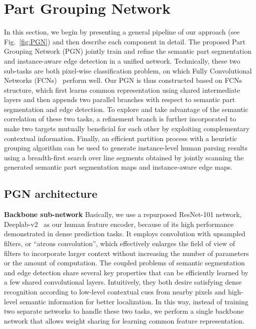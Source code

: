 \documentclass[runningheads]{llncs}
\begin{document}
\section{Part Grouping Network}
In this section, we begin by presenting a general pipeline of our approach (see Fig.~\ref{fig:PGN}) and then describe each component in detail. The proposed Part Grouping Network (PGN) jointly train and refine the semantic part segmentation and instance-aware edge detection in a unified network. Technically, these two sub-tasks are both pixel-wise classification problem, on which Fully Convolutional Networks (FCNs)~\cite{long2014fully} perform well. Our PGN is thus constructed based on FCNs structure, which first learns common representation using shared intermediate layers and then appends two parallel branches with respect to semantic part segmentation and edge detection. To explore and take advantage of the semantic correlation of these two tasks, a refinement branch is further incorporated to make two targets mutually beneficial for each other by exploiting complementary contextual information. Finally, an efficient partition process with a heuristic grouping algorithm can be used to generate instance-level human parsing results using a breadth-first search over line segments obtained by jointly scanning the generated semantic part segmentation maps and instance-aware edge maps.

\subsection{PGN architecture}

\textbf{Backbone sub-network} 
Basically, we use a repurposed ResNet-101 network, Deeplab-v2~\cite{chen2016deeplab} as our human feature encoder, because of its high performance demonstrated in dense prediction tasks. It employs convolution with upsampled filters, or “atrous convolution”, which effectively enlarges the field of view of filters to incorporate larger context without increasing the number of parameters or the amount of computation. The coupled problems of semantic segmentation and edge detection share several key properties that can be efficiently learned by a few shared convolutional layers. Intuitively, they both desire satisfying dense recognition according to low-level contextual cues from nearby pixels and high-level semantic information for better localization. In this way, instead of training two separate networks to handle these two tasks, we perform a single backbone network that allows weight sharing for learning common feature representation. 
\end{document}
